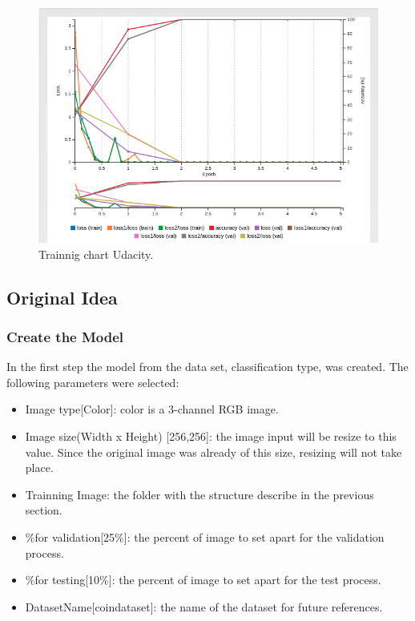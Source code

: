 \documentclass[10pt,journal,compsoc]{IEEEtran}
\begin{document}
\begin{figure}[h]
\centering
\includegraphics[scale=0.3]{trainning-chart}
\caption{Trainnig chart Udacity.}
\label{fig:figure3}
\end{figure}


\subsection{Original Idea}
\subsubsection{Create the Model}

In the first step the model from the data set, classification type, was created. The following parameters were selected:

\begin{itemize}
\item Image type[Color]: color is a  3-channel RGB image.
\item Image size(Width x Height) [256,256]: the image input will be resize to this value. Since the original image was already of this size, resizing will not take place.
\item Trainning Image: the folder with the structure describe in the previous section. 
\item \%for validation[25\%]: the percent of image to set apart for the validation process.
\item \%for testing[10\%]: the percent of image to set apart for the test process.
\item DatasetName[coin\-dataset]: the name of the dataset for future references.
\end{itemize}
\end{document}
